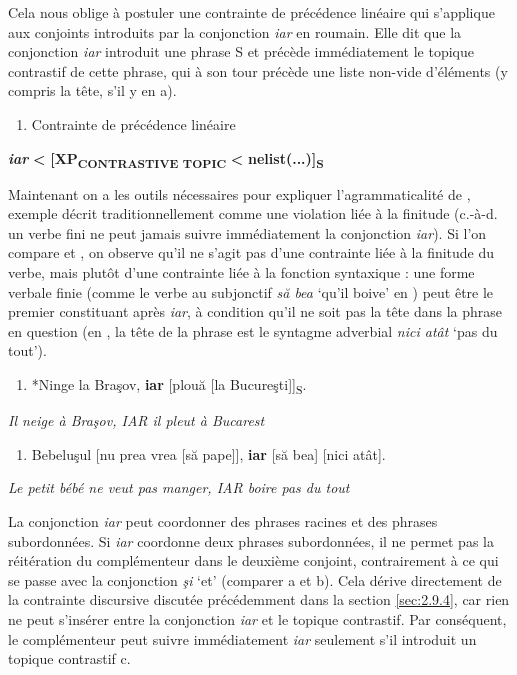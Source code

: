 Cela nous oblige à postuler une contrainte de précédence linéaire  qui s'applique aux conjoints introduits par la conjonction \textit{iar} en roumain. Elle dit que la conjonction \textit{iar} introduit une phrase S et précède immédiatement le topique contrastif de cette phrase, qui à son tour précède une liste non-vide d'éléments (y compris la tête, s'il y en a).


\begin{enumerate}
\item \label{bkm:Ref301985533}Contrainte de précédence linéaire 


\end{enumerate}
\textbf{\textit{iar} }\textbf{{\textless}}\textbf{ [}\textbf{XP}\textbf{\textsubscript{CONTRASTIVE TOPIC}}\textbf{} \textbf{{\textless}}\textbf{ nelist(...)]}\textbf{\textsubscript{S}}

Maintenant on a les outils nécessaires pour expliquer l'agrammaticalité de , exemple décrit traditionnellement comme une violation liée à la finitude (c.-à-d. un verbe fini ne peut jamais suivre immédiatement la conjonction \textit{iar}). Si l'on compare  et , on observe qu'il ne s'agit pas d'une contrainte liée à la finitude du verbe, mais plutôt d'une contrainte liée à la fonction syntaxique : une forme verbale finie (comme le verbe au subjonctif \textit{ să bea} `qu'il boive' en ) peut être le premier constituant après \textit{iar}, à condition qu'il ne soit pas la tête dans la phrase en question (en , la tête de la phrase est le syntagme adverbial \textit{nici atât} `pas du tout').  


\begin{enumerate}
\item \label{bkm:Ref301985717}*Ninge la Braşov, \textbf{iar} [plouă [la Bucureşti]]\textsubscript{S}. 


\end{enumerate}
{\itshape
Il neige à Braşov, IAR il pleut à Bucarest}


\begin{enumerate}
\item \label{bkm:Ref301985869}Bebeluşul [nu prea vrea [să pape]], \textbf{iar} [să bea] [nici atât]. 


\end{enumerate}
{\itshape
Le petit bébé ne veut pas manger, IAR boire pas du tout}

La conjonction \textit{iar} peut coordonner des phrases racines et des phrases subordonnées. Si \textit{iar} coordonne deux phrases subordonnées, il ne permet pas la réitération du complémenteur dans le deuxième conjoint, contrairement à ce qui se passe avec la conjonction \textit{şi} `et' (comparer a et b). Cela dérive directement de la contrainte discursive discutée précédemment dans la section \ref{sec:2.9.4}, car rien ne peut s'insérer entre la conjonction \textit{iar} et le topique contrastif. Par conséquent, le complémenteur peut suivre immédiatement \textit{iar} seulement s'il introduit un topique contrastif c.


